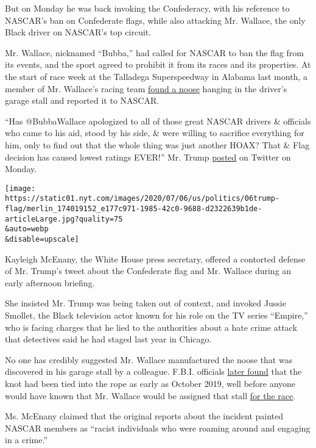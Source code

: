But on Monday he was back invoking the Confederacy, with his reference
to NASCAR's ban on Confederate flags, while also attacking Mr. Wallace,
the only Black driver on NASCAR's top circuit.

Mr. Wallace, nicknamed ``Bubba,'' had called for NASCAR to ban the flag
from its events, and the sport agreed to prohibit it from its races and
its properties. At the start of race week at the Talladega Superspeedway
in Alabama last month, a member of Mr. Wallace's racing team
\href{https://www.nytimes.com/2020/06/26/sports/autoracing/nascar-noose-bubba-wallace.html}{found
a noose} hanging in the driver's garage stall and reported it to NASCAR.

``Has @BubbaWallace apologized to all of those great NASCAR drivers \&
officials who came to his aid, stood by his side, \& were willing to
sacrifice everything for him, only to find out that the whole thing was
just another HOAX? That \& Flag decision has caused lowest ratings
EVER!'' Mr. Trump
\href{https://twitter.com/realDonaldTrump/status/1280117571874951170}{posted}
on Twitter on Monday.

\texttt{[image: https://static01.nyt.com/images/2020/07/06/us/politics/06trump-flag/merlin\_174019152\_e177c971-1985-42c0-9688-d2322639b1de-articleLarge.jpg?quality=75\\\&auto=webp\\\&disable=upscale]}

Kayleigh McEnany, the White House press secretary, offered a contorted
defense of Mr. Trump's tweet about the Confederate flag and Mr. Wallace
during an early afternoon briefing.

She insisted Mr. Trump was being taken out of context, and invoked
Jussie Smollet, the Black television actor known for his role on the TV
series ``Empire,'' who is facing charges that he lied to the authorities
about a hate crime attack that detectives said he had staged last year
in Chicago.

No one has credibly suggested Mr. Wallace manufactured the noose that
was discovered in his garage stall by a colleague. F.B.I. officials
\href{https://www.nytimes.com/2020/06/23/sports/autoracing/bubba-wallace-noose-nascar.html}{later
found} that the knot had been tied into the rope as early as October
2019, well before anyone would have known that Mr. Wallace would be
assigned that stall
\href{https://www.nytimes.com/2020/06/22/sports/autoracing/bubba-wallace-noose-nascar.html}{for
the race}.

Ms. McEnany claimed that the original reports about the incident painted
NASCAR members as ``racist individuals who were roaming around and
engaging in a crime.''

